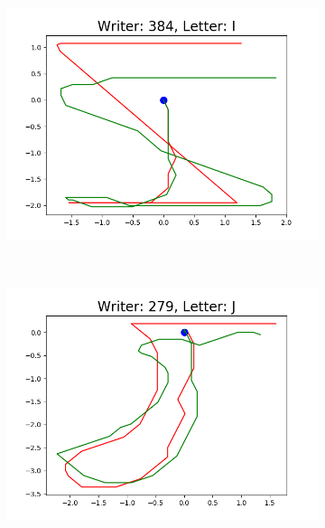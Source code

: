 \begin{figure}
\begin{subfigure}[b]{0.17\textwidth}
          \includegraphics[width=\textwidth]{images/framework/comparison_figures/I_384.png}
      \end{subfigure}
      ~
      \begin{subfigure}[b]{0.17\textwidth}
          \includegraphics[width=\textwidth]{images/framework/comparison_figures/J_279.png}
      \end{subfigure}
      ~
      \begin{subfigure}[b]{0.17\textwidth}

\end{subfigure}
\end{figure}
